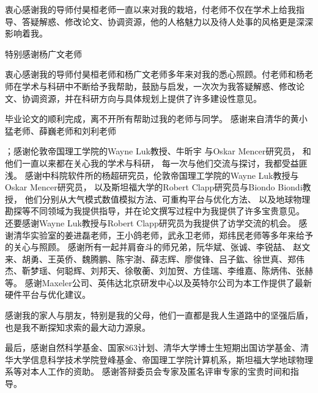 \begin{acknowledgement}

衷心感谢我的导师付昊桓老师一直以来对我的栽培，付老师不仅在学术上给我指导、答疑解惑、修改论文、协调资源，他的人格魅力以及待人处事的风格更是深深影响着我。

特别感谢杨广文老师

衷心感谢我的导师付昊桓老师和杨广文老师多年来对我的悉心照顾。付老师和杨老师在学术与科研中不断给予我帮助，鼓励与启发，一次次为我答疑解惑、修改论文、协调资源，并在科研方向与具体规划上提供了许多建设性意见。

毕业论文的顺利完成，离不开所有帮助过我的老师与同学。
感谢来自清华的黄小猛老师、薛巍老师和刘利老师

；感谢伦敦帝国理工学院的Wayne Luk教授、牛昕宇
与Oskar Mencer研究员，
和
他们一直以来都在关心我的学术与科研，
每一次与他们交流与探讨，我都受益匪浅。
感谢中科院软件所的杨超研究员，伦敦帝国理工学院的Wayne Luk教授与Oskar Mencer研究员，
以及斯坦福大学的Robert Clapp研究员与Biondo Biondi教授，
他们分别从大气模式数值模拟方法、可重构平台与优化方法、
以及地球物理勘探等不同领域为我提供指导，并在论文撰写过程中为我提供了许多宝贵意见。
还要感谢Wayne Luk教授与Robert Clapp研究员为我提供了访学交流的机会。
感谢清华实验室的姜进磊老师，王小鸽老师，武永卫老师，郑纬民老师等多年来给予的关心与照顾。
感谢所有一起并肩奋斗的师兄弟，阮华斌、张诚、李锐喆、
赵文来、胡勇、王英侨、魏腾鹏、陈宇澍、薛志辉、廖俊锋、吕子鈜、徐世真、郑伟杰、靳梦瑶、何聪辉、刘邦天、徐敬蘅、刘加贺、方佳瑞、李维嘉、陈炳伟、张赫等。
感谢Maxeler公司、英伟达北京研发中心以及英特尔公司为本工作提供了最新硬件平台与优化建议。

感谢我的家人与朋友，特别是我的父母，他们一直都是我人生道路中的坚强后盾，也是我不断探知求索的最大动力源泉。

最后，感谢自然科学基金、国家863计划、清华大学博士生短期出国访学基金、清华大学信息科学技术学院登峰基金、帝国理工学院计算机系，斯坦福大学地球物理系等对本人工作的资助。
感谢答辩委员会专家及匿名评审专家的宝贵时间和指导。
\end{acknowledgement}
